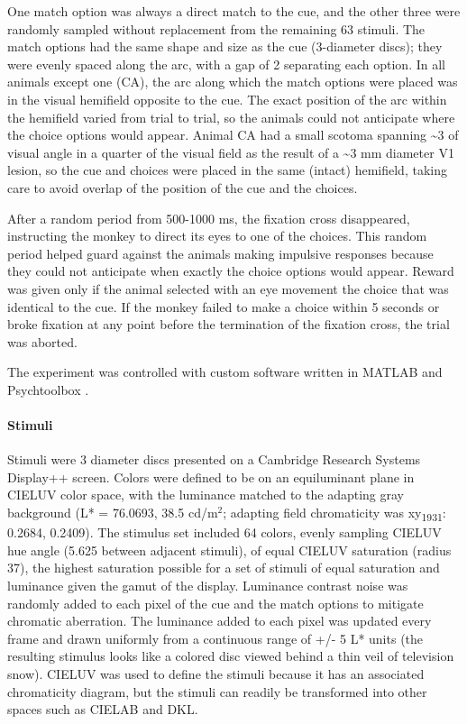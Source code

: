 \documentclass[9pt,biorxiv,lineno,onehalfspacing]{lapreprint}
\begin{document}
\begin{refsection}
One match option was always a direct match to the cue, and the other three were randomly sampled without replacement from the remaining 63 stimuli. 
The match options had the same shape and size as the cue (3\degree{}-diameter discs); they were evenly spaced along the arc, with a gap of 2\degree{} separating each option. 
In all animals except one (CA), the arc along which the match options were placed was in the visual hemifield opposite to the cue. 
The exact position of the arc within the hemifield varied from trial to trial, so the animals could not anticipate where the choice options would appear. 
Animal CA had a small scotoma spanning \textasciitilde3\degree{} of visual angle in a quarter of the visual field as the result of a \textasciitilde3 mm diameter V1 lesion, so the cue and choices were placed in the same (intact) hemifield, taking care to avoid overlap of the position of the cue and the choices. 

After a random period from 500-1000 ms, the fixation cross disappeared, instructing the monkey to direct its eyes to one of the choices. 
This random period helped guard against the animals making impulsive responses because they could not anticipate when exactly the choice options would appear. Reward was given only if the animal selected with an eye movement the choice that was identical to the cue. 
If the monkey failed to make a choice within 5 seconds or broke fixation at any point before the termination of the fixation cross, the trial was aborted.

The experiment was controlled with custom software written in MATLAB and Psychtoolbox \citep{kleiner_whats_2007}.

\paragraph{Stimuli}
Stimuli were 3\degree{} diameter discs presented on a Cambridge Research Systems Display++ screen. 
Colors were defined to be on an equiluminant plane in CIELUV color space, with the luminance matched to the adapting gray background (L* = 76.0693, 38.5 cd/m$^2$; adapting field chromaticity was xy\textsubscript{1931}: 0.2684, 0.2409). 
The stimulus set included 64 colors, evenly sampling CIELUV hue angle (5.625\degree{} between adjacent stimuli), of equal CIELUV saturation (radius 37), the highest saturation possible for a set of stimuli of equal saturation and luminance given the gamut of the display.
Luminance contrast noise was randomly added to each pixel of the cue and the match options to mitigate chromatic aberration. 
The luminance added to each pixel was updated every frame and drawn uniformly from a continuous range of +/- 5 L* units (the resulting stimulus looks like a colored disc viewed behind a thin veil of television snow). 
CIELUV was used to define the stimuli because it has an associated chromaticity diagram, but the stimuli can readily be transformed into other spaces such as CIELAB and DKL. 


\end{refsection}
\end{document}
